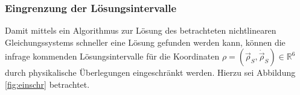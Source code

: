 \documentclass[a4paper,12pt]{article}
\numberwithin{equation}{section}
\begin{document}
\subsubsection{Eingrenzung der Lösungsintervalle}\label{sec:eingrLoesinterv}
Damit mittels ein Algorithmus zur Lösung des betrachteten nichtlinearen Gleichungssystems schneller eine Lösung gefunden werden kann, können die infrage kommenden Lösungsintervalle für die Koordinaten $\rho = (\vec{\rho}_S,\dot{\vec{\rho}}_S) \in \mathbb{R}^6$ durch physikalische Überlegungen eingeschränkt werden. Hierzu sei Abbildung \ref{fig:einschr} betrachtet.
\begin{figure}[h]
\centering



\begin{tikzpicture}[x=0.75pt,y=0.75pt,yscale=-1,xscale=1]


\end{tikzpicture}
\end{figure}
\end{document}
